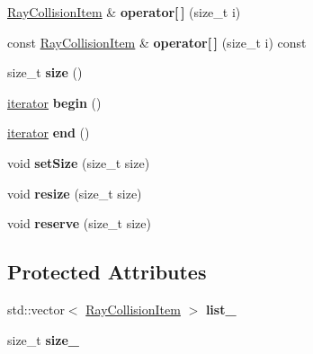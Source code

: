 \begin{DoxyCompactItemize}
\item 
\mbox{\label{classraisim_1_1RayCollisionList_a1680beda28f687cc9bb6e21241ebc03c}} 
\hyperlink{classraisim_1_1RayCollisionItem}{Ray\+Collision\+Item} \& {\bfseries operator\mbox{[}$\,$\mbox{]}} (size\+\_\+t i)
\item 
\mbox{\label{classraisim_1_1RayCollisionList_a61c698e66fd37ea31a116c689f2df330}} 
const \hyperlink{classraisim_1_1RayCollisionItem}{Ray\+Collision\+Item} \& {\bfseries operator\mbox{[}$\,$\mbox{]}} (size\+\_\+t i) const
\item 
\mbox{\label{classraisim_1_1RayCollisionList_ad59fc0372baee2f39877348039732287}} 
size\+\_\+t {\bfseries size} ()
\item 
\mbox{\label{classraisim_1_1RayCollisionList_a0a6987850cf7e1bb23e90f5539e6e8b3}} 
\hyperlink{classraisim_1_1RayCollisionList_1_1iterator}{iterator} {\bfseries begin} ()
\item 
\mbox{\label{classraisim_1_1RayCollisionList_ae70d1bd6f3ad8f2baf9d93ded33384bc}} 
\hyperlink{classraisim_1_1RayCollisionList_1_1iterator}{iterator} {\bfseries end} ()
\item 
\mbox{\label{classraisim_1_1RayCollisionList_a8a0d2611afdec9c697d792f50de74e7a}} 
void {\bfseries set\+Size} (size\+\_\+t size)
\item 
\mbox{\label{classraisim_1_1RayCollisionList_afb085245b7a4e93dd6071616e8853ef4}} 
void {\bfseries resize} (size\+\_\+t size)
\item 
\mbox{\label{classraisim_1_1RayCollisionList_a4775710c735b3b8b31e61c5d6cb1d035}} 
void {\bfseries reserve} (size\+\_\+t size)
\end{DoxyCompactItemize}
\subsection*{Protected Attributes}
\begin{DoxyCompactItemize}
\item 
\mbox{\label{classraisim_1_1RayCollisionList_a2362bfd5b54a0e289052e9c5aad99c1e}} 
std\+::vector$<$ \hyperlink{classraisim_1_1RayCollisionItem}{Ray\+Collision\+Item} $>$ {\bfseries list\+\_\+}
\item 
\mbox{\label{classraisim_1_1RayCollisionList_a9c49ede2a4a35c8ddc001e177cd1bb33}} 
size\+\_\+t {\bfseries size\+\_\+}
\end{DoxyCompactItemize}
